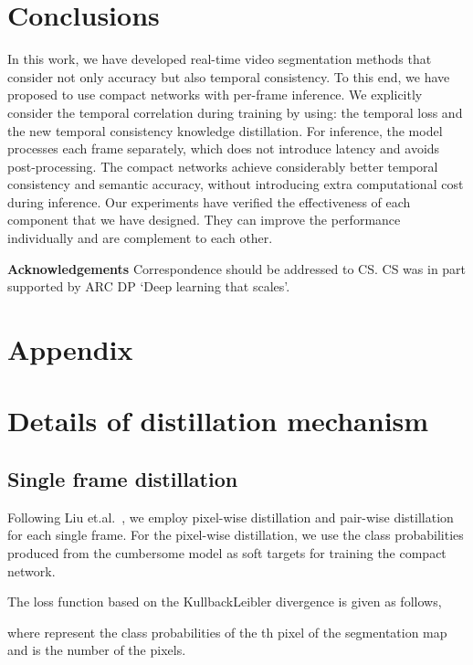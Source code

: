 \documentclass[runningheads]{llncs}
\begin{document}
\section{Conclusions}
In this work, we have developed real-time video segmentation methods that consider not only accuracy but also temporal consistency. To this end,
we have proposed to use compact networks
with per-frame inference. We explicitly consider the temporal correlation during training by using: the temporal loss and the new temporal consistency knowledge distillation.
For inference,
the model
processes
each frame separately, which
does not introduce
latency and avoids post-processing.
The compact networks achieve considerably better temporal consistency and semantic accuracy, without introducing
extra computational cost during inference. Our experiments have verified the effectiveness of each component that we have designed. They can improve the performance individually and are  complement to each other.









\textbf{Acknowledgements}
Correspondence should be addressed to CS.
CS was in part supported by ARC DP `Deep learning that scales'.


\appendix



\section*{Appendix}


\section{Details of distillation mechanism}
\subsection{Single frame distillation}
Following Liu et.al.~\cite{liu2019structured}, we employ pixel-wise distillation and pair-wise distillation for each single frame.
For the pixel-wise distillation, we use the class probabilities  produced from the cumbersome model as {soft targets} for training the compact network.

The loss function based on the KullbackLeibler divergence is given as follows,

where  represent the class probabilities
of the th pixel of the segmentation map and  is the number of the pixels.
\end{document}
